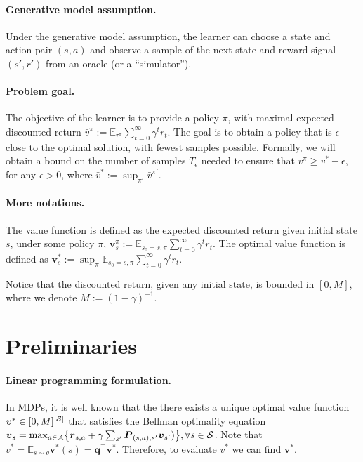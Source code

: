\documentclass{article}
\DeclarePairedDelimiter\brc{\{}{\}}%
\DeclarePairedDelimiter\abs{\lvert}{\rvert}%
\newcommand{\E}{\mathbb{E}}
\newcommand{\States}{\mathcal{S}}
\newcommand{\Actions}{\mathcal{A}}
\newcommand{\nSt}{{\abs{\States}}}
\newcommand{\Pb}{\boldsymbol{P}}
\newcommand{\rb}{\boldsymbol{r}}
\newcommand{\vb}{\boldsymbol{v}}
\newcommand{\vbar}{\bar{v}}
\newcommand{\vMax}{M}
\newcommand{\initDist}{\boldsymbol{q}}
\begin{document}
\paragraph{Generative model assumption.}
Under the generative model assumption, the learner can choose a state and action pair $(s,a)$ and observe a sample of the next state and reward signal $(s',r')$ from an oracle (or a ``simulator'').

\paragraph{Problem goal.}
The objective of the learner is to provide a policy $\pi$, with maximal expected discounted return $\vbar^\pi := \E_{\tau^{\pi}} \sum_{t=0}^{\infty} \gamma^t r_t$.
The goal is to obtain a policy that is $\epsilon$-close to the optimal solution, with fewest samples possible. 
Formally, we will obtain a bound on the number of samples $T_\epsilon$ needed to ensure that $\vbar^\pi  \geq  \vbar^* - \epsilon$, for any $\epsilon > 0$, where $\vbar^*  := \sup_{\pi'} \vbar^{\pi'}$.

\paragraph{More notations.}
The value function is defined as the expected discounted return given initial state $s$, under some policy $\pi$, $\vb^\pi_s:=\E_{s_0=s, \pi} \sum_{t=0}^{\infty} \gamma^t r_t$.
The optimal value function is defined as $\vb^*_s:= \sup_{\pi} \E_{s_0=s, \pi} \sum_{t=0}^{\infty} \gamma^t r_t$.

Notice that the discounted return, given any initial state, is bounded in $[0,\vMax]$,
 where we denote $\vMax:=(1-\gamma)^{-1}$.

\section{Preliminaries} \label{sect:perliminaries}


\paragraph{Linear programming formulation.}

In MDPs, it is well known that the there exists a unique optimal value function
$\vb^* \in [0, \vMax]^\nSt$ that satisfies the Bellman optimality equation $\vb_s = \max_{a \in \Actions} \brc*{ \rb_{s,a} + \gamma \sum_{s'} \Pb_{(s,a),s'} \vb_{s'})}, \forall s \in \States$.
Note that $ \vbar^* = \E_{s\sim q} \vb^*(s) = \initDist^\top \vb^*$.
Therefore, to evaluate $\vbar^*$ we can find  $\vb^*$.
\end{document}
